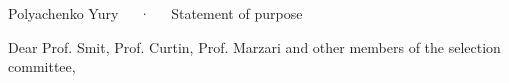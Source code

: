 \documentclass[12pt, a4paper]{awesome-cv}
\begin{document}
\makecvheader[C]

\makecvfooter
  {\thepage}
  {Polyachenko Yury~~~·~~~Statement of purpose}
  {\thepage}

\vspace{25pt}
\hspace{5pt} Dear Prof. Smit, Prof. Curtin, Prof. Marzari and other members of the selection committee, 

\end{document}
